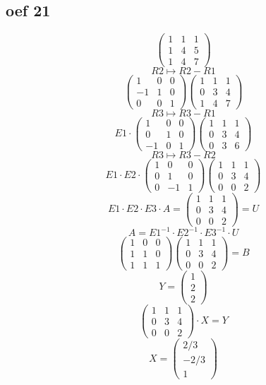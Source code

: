 \documentclass[lineaire_algebra_oplossingen.tex]{subfiles}
\begin{document}
\subsection{oef 21}
\[
\begin{pmatrix}
1 & 1 & 1\\
1 & 4 & 5\\
1 & 4 & 7
\end{pmatrix}
\]
\[R2 \longmapsto R2-R1\]
\[
\begin{pmatrix}
1 & 0 & 0\\
-1 & 1 & 0\\
0 & 0 & 1
\end{pmatrix}
\begin{pmatrix}
1 & 1 & 1\\
0 & 3 & 4\\
1 & 4 & 7
\end{pmatrix}
\]
\[R3 \longmapsto R3-R1\]
\[ E1 \cdot
\begin{pmatrix}
1 & 0 & 0\\
0 & 1 & 0\\
-1 & 0 & 1
\end{pmatrix}
\begin{pmatrix}
1 & 1 & 1\\
0 & 3 & 4\\
0 & 3 & 6
\end{pmatrix}
\]
\[R3 \longmapsto R3-R2\]
\[ E1 \cdot E2 \cdot
\begin{pmatrix}
1 & 0 & 0\\
0 & 1 & 0\\
0 & -1 & 1
\end{pmatrix}
\begin{pmatrix}
1 & 1 & 1\\
0 & 3 & 4\\
0 & 0 & 2
\end{pmatrix}
\]
\[\]
\[E1 \cdot E2 \cdot E3 \cdot A = 
\begin{pmatrix}
1 & 1 & 1\\
0 & 3 & 4\\
0 & 0 & 2
\end{pmatrix}
= U \]
\[A = E1^{-1} \cdot E2^{-1} \cdot E3^{-1} \cdot U\]
\[
\begin{pmatrix}
1 & 0 & 0\\
1 & 1 & 0\\
1 & 1 & 1
\end{pmatrix}
\begin{pmatrix}
1 & 1 & 1\\
0 & 3 & 4\\
0 & 0 & 2
\end{pmatrix}
= B\]
\[ Y =
\begin{pmatrix}
1 \\
2 \\
2 
\end{pmatrix}
\]
\[
\begin{pmatrix}
1 & 1 & 1\\
0 & 3 & 4\\
0 & 0 & 2
\end{pmatrix}
\cdot X = Y\]
\[ X =
\begin{pmatrix}
2/3\\
-2/3\\
1
\end{pmatrix}
\]
\end{document}
